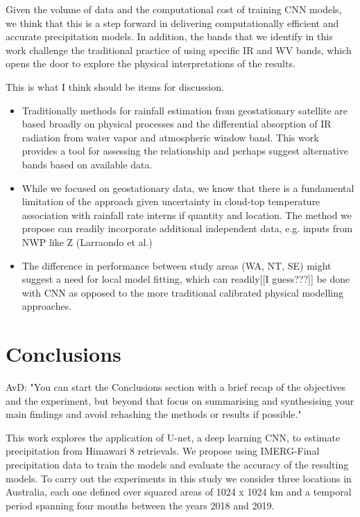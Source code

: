 \documentclass[3p,times]{elsarticle}
\begin{document}
Given the volume of data and the computational cost of training CNN models, we think that this is a step forward in delivering computationally efficient and accurate precipitation models. In addition, the bands that we identify in this work challenge the traditional practice of using specific IR and WV bands, which opens the door to explore the physical interpretations of the results.

This is what I think should be items for discussion.
\begin{itemize}
    \item Traditionally methods for rainfall estimation from geostationary satellite are based broadly on physical processes and the differential absorption of IR radiation from water vapor and atmospheric window band. This work provides a tool for assessing the relationship and perhaps suggest alternative bands based on available data. 
    
    \item While we focused on geostationary data, we know that there is a fundamental limitation of the approach given uncertainty in cloud-top temperature association with rainfall rate interns if quantity and location. The method we propose can readily incorporate additional independent data, e.g. inputs from NWP like Z (Larraondo et al.)  
    
    \item The difference in performance between study areas (WA, NT, SE) might suggest a need for local model fitting, which can readily[[I guess???]] be done with CNN as opposed to the more traditional calibrated physical modelling approaches.
\end{itemize}

\section{Conclusions}  %

AvD: "You can start the Conclusions section with a brief recap of the objectives and the experiment, but beyond that focus on summarising and synthesising your main findings and avoid rehashing the methods or results if possible."

This work explores the application of U-net, a deep learning CNN, to estimate precipitation from Himawari 8 retrievals. We propose using IMERG-Final precipitation data to train the models and evaluate the accuracy of the resulting models. To carry out the experiments in this study we consider three locations in Australia, each one defined over squared areas of 1024 x 1024 km and a temporal period spanning four months between the years 2018 and 2019.
\end{document}
